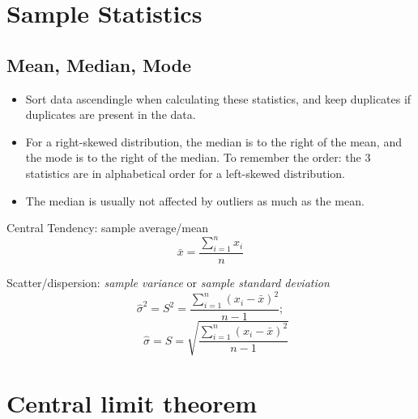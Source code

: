 \documentclass[a4paper,11pt,dvipsnames]{book}
\begin{document}
\section*{Sample Statistics}

\subsection*{Mean, Median, Mode}
\begin{itemize}
\item Sort data ascendingle when calculating these statistics, and keep duplicates if duplicates are present in the data.
\item For a right-skewed distribution, the median is to the right of the mean, and the mode is to the right of the median. To remember the order: the 3 statistics are in alphabetical order for a left-skewed distribution.
\item The median is usually not affected by outliers as much as the mean.
\end{itemize}

Central Tendency: sample average/mean 
$$\bar{x}=\frac{\sum\limits_{i=1}^{n} x_i}{n}$$

Scatter/dispersion: \emph{sample variance} or \emph{sample standard deviation}
$$\hat{\sigma}^2=S^2=\frac{\sum\limits_{i=1}^{n}(x_i-\bar{x})^2}{n-1};$$
$$\quad\hat{\sigma}=S=\sqrt{\frac{\sum\limits_{i=1}^{n}(x_i-\bar{x})^2}{n-1}}$$

\section*{Central limit theorem}
\end{document}
